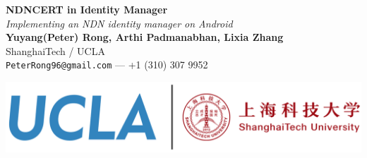 \documentclass[a0,portrait]{poster}
\begin{document}


\begin{minipage}[b]{0.6\linewidth}
\veryHuge \color{NavyBlue} \textbf{NDNCERT in Identity Manager} \color{Black}\\ %
\Huge\textit{Implementing an NDN identity manager on Android}\\[2cm] %
\Large \textbf{Yuyang(Peter) Rong, Arthi Padmanabhan, Lixia Zhang \footnotemark}\\[0.5cm] %
\Large ShanghaiTech / UCLA \\ [0.4cm] %
\Large \texttt{PeterRong96@gmail.com} --- +1 (310) 307 9952\\
\end{minipage}
%
\begin{minipage}[b]{0.4\linewidth}
	\includegraphics[width=\linewidth]{figures/logo.png}\\
\end{minipage}

\vspace{0.7cm} %

\end{document}
